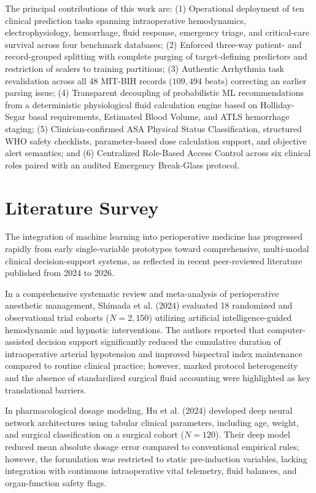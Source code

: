 \documentclass[conference]{IEEEtran}
\begin{document}
The principal contributions of this work are: (1) Operational deployment of ten clinical prediction tasks spanning intraoperative hemodynamics, electrophysiology, hemorrhage, fluid response, emergency triage, and critical-care survival across four benchmark databases; (2) Enforced three-way patient- and record-grouped splitting with complete purging of target-defining predictors and restriction of scalers to training partitions; (3) Authentic Arrhythmia task revalidation across all 48 MIT-BIH records ($109,494$ beats) correcting an earlier parsing issue; (4) Transparent decoupling of probabilistic ML recommendations from a deterministic physiological fluid calculation engine based on Holliday-Segar basal requirements, Estimated Blood Volume, and ATLS hemorrhage staging; (5) Clinician-confirmed ASA Physical Status Classification, structured WHO safety checklists, parameter-based dose calculation support, and objective alert semantics; and (6) Centralized Role-Based Access Control across six clinical roles paired with an audited Emergency Break-Glass protocol.

\section{Literature Survey}
The integration of machine learning into perioperative medicine has progressed rapidly from early single-variable prototypes toward comprehensive, multi-modal clinical decision-support systems, as reflected in recent peer-reviewed literature published from 2024 to 2026.

In a comprehensive systematic review and meta-analysis of perioperative anesthetic management, Shimada et al. (2024) evaluated 18 randomized and observational trial cohorts ($N=2,150$) utilizing artificial intelligence-guided hemodynamic and hypnotic interventions. The authors reported that computer-assisted decision support significantly reduced the cumulative duration of intraoperative arterial hypotension and improved bispectral index maintenance compared to routine clinical practice; however, marked protocol heterogeneity and the absence of standardized surgical fluid accounting were highlighted as key translational barriers.

In pharmacological dosage modeling, Hu et al. (2024) developed deep neural network architectures using tabular clinical parameters, including age, weight, and surgical classification on a surgical cohort ($N=120$). Their deep model reduced mean absolute dosage error compared to conventional empirical rules; however, the formulation was restricted to static pre-induction variables, lacking integration with continuous intraoperative vital telemetry, fluid balances, and organ-function safety flags.
\end{document}
